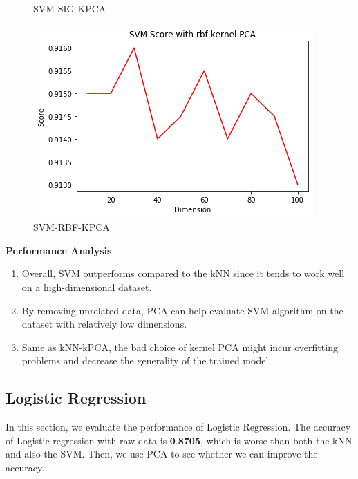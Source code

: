 \documentclass[12pt]{article}
\begin{document}
\begin{figure}[htb]
\begin{minipage}{0.3\textwidth}
		\caption{SVM-SIG-KPCA}
		\label{fig:SVM-SIG-KPCA}
	\end{minipage}
	\begin{minipage}{0.3\textwidth}
		\centering
		\includegraphics[width=\linewidth]{./exp-figs/SVM-RBF-KPCA.png}
		\caption{SVM-RBF-KPCA}
		\label{fig:SVM-RBF-KPCA}
	\end{minipage}
\end{figure}

\textbf{Performance Analysis} 

\begin{enumerate}[label=(\roman*)]
	\item Overall, SVM outperforms compared to the kNN since it tends to work well on a high-dimensional dataset.
	\item By removing unrelated data, PCA can help evaluate SVM algorithm on the dataset with relatively low dimensions. 
	\item Same as kNN-kPCA, the bad choice of kernel PCA might incur overfitting problems and decrease the generality of the trained model.
\end{enumerate}

\subsection{Logistic Regression}
In this section, we evaluate the performance of Logistic Regression. The accuracy of Logistic regression with raw data is $\textbf{0.8705}$, which is worse than both the kNN and also the SVM. Then, we use PCA to see whether we can improve the accuracy.
\end{document}
